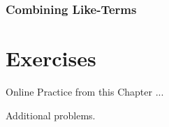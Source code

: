 \subsubsection{Combining Like-Terms}

\newpage 
\section{Exercises} 

Online Practice from this Chapter ... 

Additional problems. 















